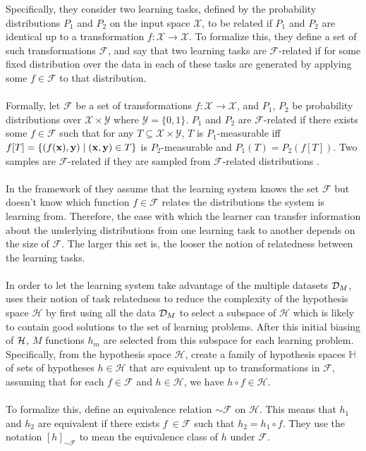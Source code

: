 Specifically, they consider two learning tasks, defined by the probability distributions $P_1$ and $P_2$ on the input space $\mathcal{X}$, to be related if $P_1$ and $P_2$ are identical up to a transformation $f: \mathcal{X} \to \mathcal{X}$. To formalize this, they define a set of such transformations $\mathcal{F}$, and say that two learning tasks are $\mathcal{F}$-related if for some fixed distribution over the data in each of these tasks are generated by applying some $f \in \mathcal{F}$ to that distribution.
\\\\
Formally, let $\mathcal{F}$ be a set of transformations $f: \mathcal{X} \to \mathcal{X}$, and $P_1$, $P_2$ be probability distributions over $\mathcal{X} \times \mathcal{Y}$ where $\mathcal{Y} = \{0,1\}$. $P_1$ and $P_2$ are $\mathcal{F}$-related if there exists some $f \in \mathcal{F}$ such that for any $T \subseteq \mathcal{X} \times \mathcal{Y}$, $T$ is $P_1$-measurable iff $f[T] = \{(f(\mathbf{x}), \mathbf{y}) \mid (\mathbf{x}, \mathbf{y}) \in T\}$ is $P_2$-measurable and $P_1(T) = P_2(f[T])$. Two samples are $\mathcal{F}$-related if they are sampled from $\mathcal{F}$-related distributions \citep{ben2003}.
\\\\
In the framework of \citet{ben2003} they assume that the learning system knows the set $\mathcal{F}$ but doesn't know which function $f \in \mathcal{F}$ relates the distributions the system is learning from. Therefore, the ease with which the learner can transfer information about the underlying distributions from one learning task to another depends on the size of $\mathcal{F}$. The larger this set is, the looser the notion of relatedness between the learning tasks.
\\\\
In order to let the learning system take advantage of the multiple datasets $\mathcal{D}_M$, \citet{ben2003} uses their notion of task relatedness to reduce the complexity of the hypothesis space $\mathcal{H}$ by first using all the data $\mathcal{D}_M$ to select a subspace of $\mathcal{H}$ which is likely to contain good solutions to the set of learning problems. After this initial biasing of $\mathcal{H}$, $M$ functions $h_m$ are selected from this subspace for each learning problem. Specifically, from the hypothesis space $\mathcal{H}$, create a family of hypothesis spaces $\mathbb{H}$ of sets of hypotheses $h \in \mathcal{H}$ that are equivalent up to transformations in $\mathcal{F}$, assuming that for each $f \in \mathcal{F}$ and $h \in \mathcal{H}$, we have $h \circ f \in \mathcal{H}$. 
\\\\
To formalize this, \citet{ben2003} define an equivalence relation $\sim \mathcal{F}$ on $\mathcal{H}$. This means that $h_1$ and $h_2$ are equivalent if there exists $f\ \in \mathcal{F}$ such that $h_2 = h_1 \circ f$. They use the notation $[h]_{\sim \mathcal{F}}$ to mean the equivalence class of $h$ under $\mathcal{F}$. 


